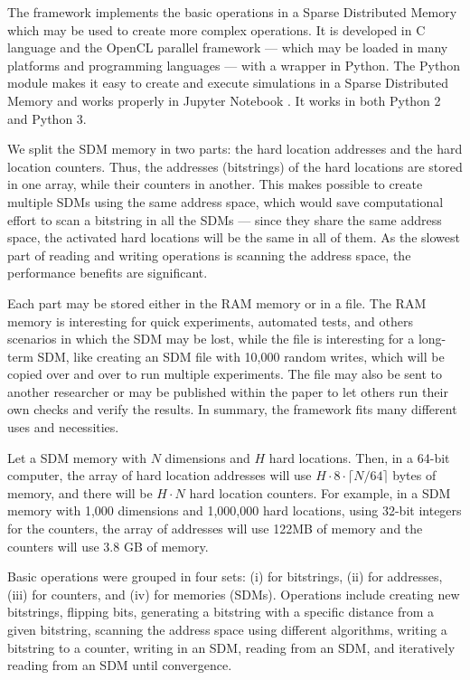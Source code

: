 
The framework implements the basic operations in a Sparse Distributed Memory which may be used to create more complex operations. It is developed in C language and the OpenCL parallel framework --- which may be loaded in many platforms and programming languages --- with a wrapper in Python. The Python module makes it easy to create and execute simulations in a Sparse Distributed Memory and works properly in Jupyter Notebook \citep{kluyver2016jupyter}. It works in both Python 2 and Python 3.

We split the SDM memory in two parts: the hard location addresses and the hard location counters. Thus, the addresses (bitstrings) of the hard locations are stored in one array, while their counters in another. This makes possible to create multiple SDMs using the same address space, which would save computational effort to scan a bitstring in all the SDMs --- since they share the same address space, the activated hard locations will be the same in all of them. As the slowest part of reading and writing operations is scanning the address space, the performance benefits are significant.

Each part may be stored either in the RAM memory or in a file. The RAM memory is interesting for quick experiments, automated tests, and others scenarios in which the SDM may be lost, while the file is interesting for a long-term SDM, like creating an SDM file with 10,000 random writes, which will be copied over and over to run multiple experiments. The file may also be sent to another researcher or may be published within the paper to let others run their own checks and verify the results. In summary, the framework fits many different uses and necessities.

Let a SDM memory with $N$ dimensions and $H$ hard locations. Then, in a 64-bit computer, the array of hard location addresses will use $H \cdot 8 \cdot \lceil N/64 \rceil$ bytes of memory, and there will be $H \cdot N$ hard location counters. For example, in a SDM memory with 1,000 dimensions and 1,000,000 hard locations, using 32-bit integers for the counters, the array of addresses will use 122MB of memory and the counters will use 3.8 GB of memory.

Basic operations were grouped in four sets: (i) for bitstrings, (ii) for addresses, (iii) for counters, and (iv) for memories (SDMs). Operations include creating new bitstrings, flipping bits, generating a bitstring with a specific distance from a given bitstring, scanning the address space using different algorithms, writing a bitstring to a counter, writing in an SDM, reading from an SDM, and iteratively reading from an SDM until convergence.



